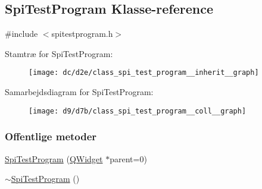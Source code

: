 \hypertarget{class_spi_test_program}{}\subsection{Spi\+Test\+Program Klasse-\/reference}
\label{class_spi_test_program}


{\ttfamily \#include $<$spitestprogram.\+h$>$}



Stamtræ for Spi\+Test\+Program\+:
\nopagebreak
\begin{figure}[H]
\begin{center}
\leavevmode
\texttt{[image: dc/d2e/class\_spi\_test\_program\_\_inherit\_\_graph]}
\end{center}
\end{figure}


Samarbejdsdiagram for Spi\+Test\+Program\+:
\nopagebreak
\begin{figure}[H]
\begin{center}
\leavevmode
\texttt{[image: d9/d7b/class\_spi\_test\_program\_\_coll\_\_graph]}
\end{center}
\end{figure}
\subsubsection*{Offentlige metoder}
\begin{DoxyCompactItemize}
\item 
\hyperlink{class_spi_test_program_aea7280e485f6a12d40676144c83044b7}{Spi\+Test\+Program} (\hyperlink{class_q_widget}{Q\+Widget} $\ast$parent=0)
\item 
\hyperlink{class_spi_test_program_aacfefd1f225cb5dfdade78a4fbee94bd}{$\sim$\+Spi\+Test\+Program} ()
\end{DoxyCompactItemize}
